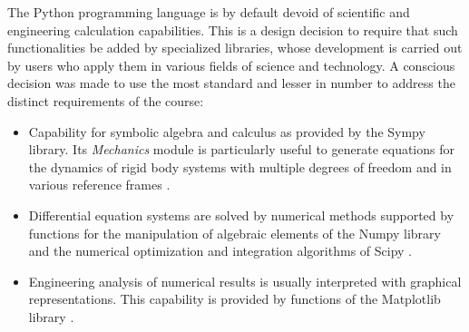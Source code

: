 
The Python programming language is by default devoid of scientific and engineering calculation capabilities. 
This is a design decision to require that such functionalities be added by specialized libraries, whose development is carried out by users who apply them in various fields of science and technology.
A conscious decision was made to use the most standard and lesser in number to address the distinct requirements of the course:
\begin{itemize}
    \item Capability for symbolic algebra and calculus as provided by the Sympy library.
    Its \textit{Mechanics} module is particularly useful to generate equations for the dynamics of rigid body systems with multiple degrees of freedom and in various reference frames \cite{sympy}.
    \item Differential equation systems are solved by numerical methods supported by functions for the manipulation of algebraic elements of the Numpy library \cite{numpy} and the numerical optimization and integration algorithms of Scipy \cite{SciPy}.
    \item Engineering analysis of numerical results is usually interpreted with graphical representations. 
    This capability is provided by functions of the Matplotlib library \cite{matplotlib}.
\end{itemize}
